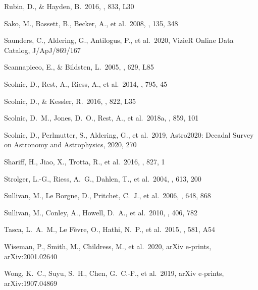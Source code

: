 \documentclass[]{aa}
\begin{document}
\begin{thebibliography}{}
 Rubin, D., \& Hayden, B.\ 2016,
\apjl, 833, L30


 Sako, M., Bassett, B., Becker, A., et al.\
2008, \aj, 135, 348

 Saunders, C., Aldering, G.,
Antilogus, P., et al.\ 2020, VizieR Online Data Catalog, J/ApJ/869/167

 Scannapieco, E., \&
Bildsten, L.\ 2005, \apjl, 629, L85 

 Scolnic, D., Rest, A., Riess, A., et
al.\ 2014, \apj, 795, 45

 Scolnic, D., \& Kessler, R.\
2016, \apjl, 822, L35

 Scolnic, D.~M., Jones, D.~O., Rest,
A., et al.\ 2018a, \apj, 859, 101

 Scolnic, D., Perlmutter, S.,
Aldering, G., et al.\ 2019, Astro2020: Decadal Survey on Astronomy and
Astrophysics, 2020, 270

 Shariff, H., Jiao, X., Trotta, R.,
et al.\ 2016, \apj, 827, 1

 Strolger, L.-G., Riess, A.~G.,
Dahlen, T., et al.\ 2004, \apj, 613, 200

 Sullivan, M., Le  Borgne, D.,
Pritchet, C.~J., et al.\ 2006, \apj, 648, 868 

 Sullivan, M., Conley, A., Howell,
D.~A., et al.\ 2010, \mnras, 406, 782


 Tasca, L.~A.~M., Le F{\`e}vre, O.,
Hathi, N.~P., et al.\ 2015, \aap, 581, A54


 Wiseman, P., Smith, M., Childress,
M., et al.\ 2020, arXiv e-prints, arXiv:2001.02640

 Wong, K.~C., Suyu, S.~H., Chen, G.~C.-F.,
et al.\ 2019, arXiv e-prints, arXiv:1907.04869

\end{thebibliography}
\end{document}
